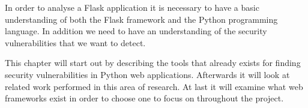 In order to analyse a Flask application it is necessary to have a basic understanding of both the Flask framework and the Python programming language.
In addition we need to have an understanding of the security vulnerabilities that we want to detect.

This chapter will start out by describing the tools that already exists for finding security vulnerabilities in Python web applications.
Afterwards it will look at related work performed in this area of research.
At last it will examine what web frameworks exist in order to choose one to focus on throughout the project.
